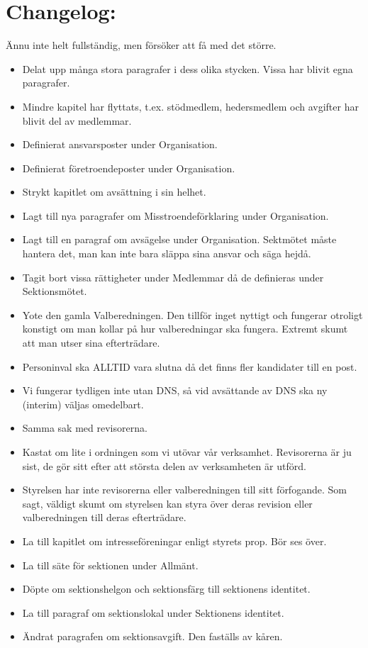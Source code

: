 \documentclass[a4paper]{dtek}
\begin{document}
\section{Changelog:}
Ännu inte helt fullständig, men försöker att få med det större.
\begin{itemize}
  \item Delat upp många stora paragrafer i dess olika stycken. Vissa har blivit egna paragrafer.
  \item Mindre kapitel har flyttats, t.ex. stödmedlem, hedersmedlem och avgifter har blivit del av medlemmar.
  \item Definierat ansvarsposter under Organisation.
  \item Definierat företroendeposter under Organisation.
  \item Strykt kapitlet om avsättning i sin helhet.
  \item Lagt till nya paragrafer om Misstroendeförklaring under Organisation.
  \item Lagt till en paragraf om avsägelse under Organisation. Sektmötet måste hantera det, man kan inte bara släppa sina ansvar och säga hejdå.
  \item Tagit bort vissa rättigheter under Medlemmar då de definieras under Sektionsmötet.
  \item Yote den gamla Valberedningen. Den tillför inget nyttigt och fungerar otroligt konstigt om man kollar på hur valberedningar ska fungera. Extremt skumt att man utser sina efterträdare.
  \item Personinval ska ALLTID vara slutna då det finns fler kandidater till en post.
  \item Vi fungerar tydligen inte utan DNS, så vid avsättande av DNS ska ny (interim) väljas omedelbart.
  \item Samma sak med revisorerna.
  \item Kastat om lite i ordningen som vi utövar vår verksamhet. Revisorerna är ju sist, de gör sitt efter att största delen av verksamheten är utförd.
  \item Styrelsen har inte revisorerna eller valberedningen till sitt förfogande. Som sagt, väldigt skumt om styrelsen kan styra över deras revision eller valberedningen till deras efterträdare.
  \item La till kapitlet om intresseföreningar enligt styrets prop. Bör ses över.
  \item La till säte för sektionen under Allmänt.
  \item Döpte om sektionshelgon och sektionsfärg till sektionens identitet.
  \item La till paragraf om sektionslokal under Sektionens identitet.
  \item Ändrat paragrafen om sektionsavgift. Den faställs av kåren.
\end{itemize}
\end{document}
